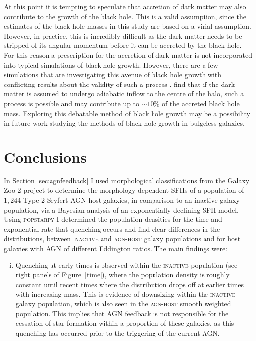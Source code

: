 {At this point it is tempting to speculate that accretion of dark matter may also contribute to the growth of the black hole. This is a valid assumption, since the estimates of the black hole masses in this study are based on a virial assumption. However, in practice, this is incredibly difficult as the dark matter needs to be stripped of its angular momentum before it can be accreted by the black hole. For this reason a prescription for the accretion of dark matter is not incorporated into typical simulations of black hole growth. However, there are a few simulations that are investigating this avenue of black hole growth with conflicting results about the validity of such a process \citep{munyaneza06, peirani08, umeda09, hernandez10, guzman11, pepe12, lora14}. \cite{peirani08} find that if the dark matter is assumed to undergo adiabatic inflow to the centre of the halo, such a process is possible and may contribute up to $\sim10\%$ of the accreted black hole mass. Exploring this debatable method of black hole growth may be a possibility in future work studying the methods of black hole growth in bulgeless galaxies. 

\section{Conclusions}\label{sec:agnconclusion}

In Section \ref{sec:agnfeedback} I used morphological classifications from the Galaxy Zoo 2 project to determine the morphology-dependent SFHs of a population of $1,244$ Type 2 Seyfert AGN host galaxies, in comparison to an inactive galaxy population, via a Bayesian analysis of an exponentially declining SFH model. Using \textsc{popstarpy} I determined the population densities for the time and exponential rate that quenching occurs and find clear differences in the distributions, between \textsc{inactive} and \textsc{agn-host} galaxy populations and for host galaxies with AGN of different Eddington ratios. The main findings were:

\begin{enumerate}[(i)]
\item Quenching at early times is observed within the \textsc{inactive} population (see right panels of Figure~\ref{time}), where the population density is roughly constant until recent times where the distribution drops off at earlier times with increasing mass. This is evidence of downsizing within the \textsc{inactive} galaxy population, which is also seen in the \textsc{agn-host} smooth weighted population. This implies that AGN feedback is not responsible for the cessation of star formation within a proportion of these galaxies, as this quenching has occurred prior to the triggering of the current AGN.


\end{enumerate}}
